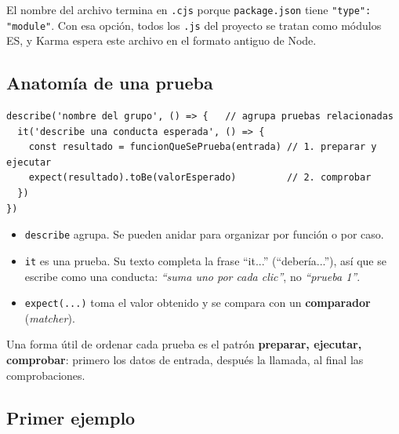 \documentclass[11pt,a4paper]{article}
\newcommand{\cmd}[1]{\texttt{\color{reactdark}#1}}
\begin{document}
\begin{nota}
El nombre del archivo termina en \cmd{.cjs} porque \cmd{package.json} tiene \cmd{"type": "module"}. Con esa opción, todos los \cmd{.js} del proyecto se tratan como módulos ES, y Karma espera este archivo en el formato antiguo de Node.
\end{nota}

\subsection{Anatomía de una prueba}

\begin{lstlisting}[language=JSX]
describe('nombre del grupo', () => {   // agrupa pruebas relacionadas
  it('describe una conducta esperada', () => {
    const resultado = funcionQueSePrueba(entrada) // 1. preparar y ejecutar
    expect(resultado).toBe(valorEsperado)         // 2. comprobar
  })
})
\end{lstlisting}

\begin{itemize}
  \item \cmd{describe} agrupa. Se pueden anidar para organizar por función o por caso.
  \item \cmd{it} es una prueba. Su texto completa la frase ``it...'' (``debería...''), así que se escribe como una conducta: \emph{``suma uno por cada clic''}, no \emph{``prueba 1''}.
  \item \cmd{expect(...)} toma el valor obtenido y se compara con un \textbf{comparador} (\emph{matcher}).
\end{itemize}

Una forma útil de ordenar cada prueba es el patrón \textbf{preparar, ejecutar, comprobar}: primero los datos de entrada, después la llamada, al final las comprobaciones.

\subsection{Primer ejemplo}
\end{document}
